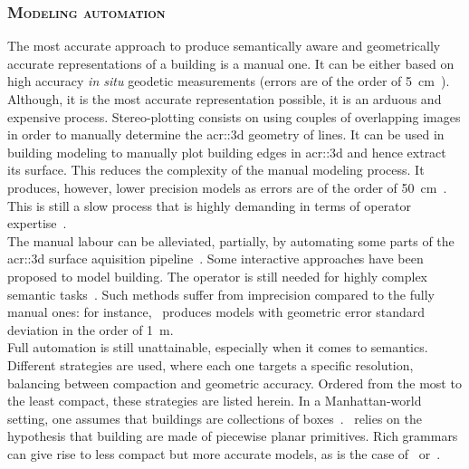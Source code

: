        \subsubsection{\textsc{Modeling automation}}
            The most accurate approach to produce semantically aware and geometrically accurate representations of a building is a manual one.
            It can be either based on high accuracy \textit{in situ} geodetic measurements (errors are of the order of \SI{5}{\cm}~\parencite{kaartinen2005accuracy}).
            Although, it is the most accurate representation possible, it is an arduous and expensive process.
            Stereo-plotting consists on using couples of overlapping images in order to manually determine the \gls{acr::3d} geometry of lines.
            It can be used in building modeling to manually plot building edges in \gls{acr::3d} and hence extract its surface.
            This reduces the complexity of the manual modeling process.
            It produces, however, lower precision models as errors are of the order of \SI{50}{\cm}~\parencite{jamet1995building}.
            This is still a slow process that is highly demanding in terms of operator expertise~\parencite{ruther2002application}.\\
            The manual labour can be alleviated, partially, by automating some parts of the \gls{acr::3d} surface aquisition pipeline~\parencite{musialski2013survey}.
            Some interactive approaches have been proposed to model building.
            The operator is still needed for highly complex semantic tasks~\parencite{mayunga2005semi, castellazzi2015laser}.
            Such methods suffer from imprecision compared to the fully manual ones: for instance,~\textcite{mayunga2005semi} produces models with geometric error standard deviation in the order of \SI{1}{\m}.\\
            Full automation is still unattainable, especially when it comes to semantics.
            Different strategies are used, where each one targets a specific resolution, balancing between compaction and geometric accuracy.
            Ordered from the most to the least compact, these strategies are listed herein.
            In a Manhattan-world setting, one assumes that buildings are collections of boxes~\parencite{vanegas2010building, li2016manhattan}.~\textcite{lafarge2012creating, nan2017polyfit}
            relies on the hypothesis that building are made of piecewise planar primitives.
            Rich grammars can give rise to less compact but more accurate models, as is the case of~\textcite{demir2015procedural} or~\textcite{zeng2018neural}.
